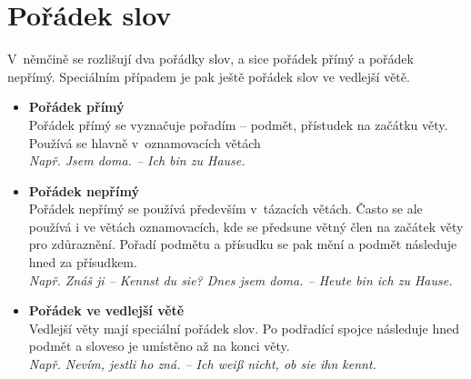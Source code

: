\documentclass[12pt,a4paper]{report}
\begin{document}
\section{Pořádek slov}
V~němčině se rozlišují dva pořádky slov, a sice pořádek přímý a pořádek nepřímý. Speciálním případem je pak ještě pořádek slov ve vedlejší větě.

\begin{itemize}
\item
\textbf{Pořádek přímý}\\
Pořádek přímý se vyznačuje pořadím -- podmět, přístudek na začátku věty. Používá se hlavně v~oznamovacích větách\\
\textit{Např. Jsem doma. -- Ich bin zu Hause.}

\item
\textbf{Pořádek nepřímý}\\
Pořádek nepřímý se používá především v~tázacích větách. Často se ale používá i ve větách oznamovacích, kde se předsune větný člen na začátek věty pro zdůraznění. Pořadí podmětu a přísudku se pak mění a podmět následuje hned za přísudkem.\\
\textit{Např. Znáš ji -- Kennst du sie? Dnes jsem doma. -- Heute bin ich zu Hause.}

\item
\textbf{Pořádek ve vedlejší větě}\\
Vedlejší věty mají speciální pořádek slov. Po podřadící spojce následuje hned podmět a sloveso je umístěno až na konci věty.\\
\textit{Např. Nevím, jestli ho zná. -- Ich weiß nicht, ob sie ihn kennt.}
\end{itemize}
\end{document}
